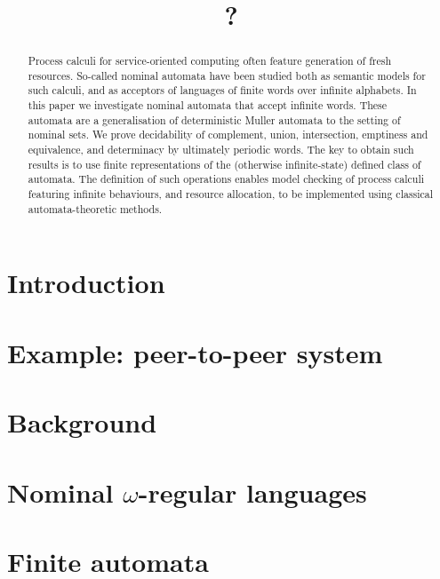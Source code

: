\documentclass{elsarticle}
\title{?}
\theoremstyle{plain}
\theoremstyle{definition}
\theoremstyle{remark}
\begin{document}
 \begin{abstract}
Process calculi for service-oriented computing often feature generation of fresh resources. So-called nominal automata have been studied both as semantic models for such calculi, and as acceptors of languages of finite words over infinite alphabets. In this paper we investigate nominal automata that accept infinite words. These automata are a generalisation of deterministic Muller automata to the setting of nominal sets. We prove decidability of complement, union, intersection, emptiness and equivalence, and determinacy by ultimately periodic words. The key to obtain such results is to use finite representations of the (otherwise infinite-state) defined class of automata. The definition of such operations enables model checking of process calculi featuring infinite behaviours, and resource allocation, to be implemented using classical automata-theoretic methods.
\end{abstract}

\maketitle

\section{Introduction}\label{sec:introduction}

\section{Example: peer-to-peer system}\label{sec:example}


\section{Background}\label{sec:background}

\section{Nominal \texorpdfstring{$\omega$}{omega}-regular languages}\label{sec:languages}


\section{Finite automata}\label{sec:hd-automata}

\end{document}
